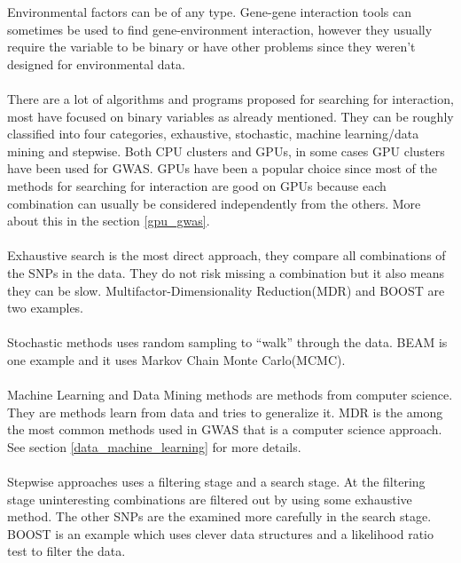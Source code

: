\documentclass[10pt,a4paper]{article}
\begin{document}
Environmental factors can be of any type\cite{gene_enviroment_2013}. Gene-gene interaction tools can sometimes be used to find gene-environment interaction, however they usually require the variable to be binary or have other problems since they weren't designed for environmental data.\cite{gene_enviroment_2013}\\
\\
There are a lot of algorithms and programs proposed for searching for interaction, most have focused on binary variables as already mentioned. They can be roughly classified into four categories, exhaustive, stochastic, machine learning/data mining and stepwise\cite{fast_high_order_cluster}. Both CPU clusters\cite{biforce} and GPUs\cite{gwis,gboost,gmdr_gpu,cuda_lr,genie_2012,plink_gpu}, in some cases GPU clusters\cite{gwis_conf} have been used for GWAS. GPUs have been a popular choice since most of the methods for searching for interaction are good on GPUs because each combination can usually be considered independently from the others. More about this in the section \ref{gpu_gwas}.\\
\\
Exhaustive search is the most direct approach, they compare all combinations of the SNPs in the data. They do not risk missing a combination but it also means they can be slow. Multifactor-Dimensionality Reduction(MDR)\cite{mdr_2001} and BOOST\cite{boost_gene_gene} are two examples.\\
\\
Stochastic methods uses random sampling to ``walk'' through the data. BEAM\cite{beam_2007} is one example and it uses Markov Chain Monte Carlo(MCMC).\\
\\
Machine Learning and Data Mining methods are methods from computer science. They are methods learn from data and tries to generalize it. MDR\cite{mdr_2001} is the among the most common methods used in GWAS that is a computer science approach. See section \ref{data_machine_learning} for more details.\\
\\
Stepwise approaches uses a filtering stage and a search stage. At the filtering stage uninteresting combinations are filtered out by using some exhaustive method. The other SNPs are the examined more carefully in the search stage. BOOST\cite{boost_gene_gene} is an example which uses clever data structures and a likelihood ratio test to filter the data.
\end{document}
